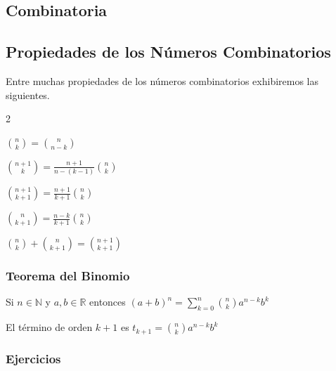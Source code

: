\subsection{Combinatoria}

\subsection{Propiedades de los N\'umeros Combinatorios}

Entre muchas propiedades de los n\'umeros combinatorios
exhibiremos las siguientes.

\begin{enumerate}
\begin{multicols}{2}
\item $\binom{n}{k}=\binom{n}{n-k}$

\item $\binom{n+1}{k}=\frac{n+1}{n-(k-1)}\binom{n}{k}$

\item $\binom{n+1}{k+1}=\frac{n+1}{k+1}\binom{n}{k}$

\item $\binom{n}{k+1}=\frac{n-k}{k+1}\binom{n}{k}$

\item $\binom{n}{k}+\binom{n}{k+1}=\binom{n+1}{k+1}$
\end{multicols}
\end{enumerate}
\subsubsection*{Teorema del Binomio}
\begin{Teo}
Si $n\in\mathbb{N}$ y $a,b\in\mathbb{R}$ entonces $(a+b)^n=\sum_{k=0}^{n}\binom{n}{k}a^{n-k}b^k$
\end{Teo}

\begin{Cor}
El t\'ermino de orden $k+1$ es $t_{k+1}=\binom{n}{k}a^{n-k}b^k$
\end{Cor}

\subsubsection*{Ejercicios}

